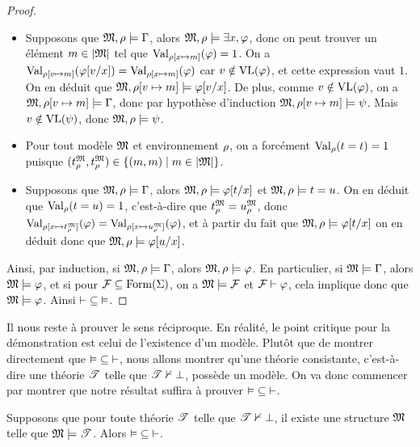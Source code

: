 \begin{proof}
\begin{itemize}
    alors $\satMI \varFF[t/x]$, mais comme on sait que
    $\ValE(\varFF[t/x])\leq\ValE(\exists x,\varFF)$, on en déduit que
    $\ValE(\exists x,\varFF) = 1$, donc $\satMI \exists x,\varFF$.
  \item[$\RexE$~:] Supposons que $\mathfrak{M},\rho\models\Gamma$,
    alors $\satMI \exists x,\varFF$, donc on peut trouver un élément
    $m\in\left\vert \mathfrak{M}\right\vert$ tel que $\operatorname{Val}_{\rho[x\mapsto m]}(\varphi) = 1$. On a
    $\operatorname{Val}_{\rho[v\mapsto m]}(\varphi[v/x]) = \operatorname{Val}_{\rho[x\mapsto m]}(\varphi)$ car
    $v \notin\operatorname{VL}(\varphi)$, et cette expression vaut $1$. On en déduit que
    $\mathfrak{M},\rho[v\mapsto m]\models \varphi[v/x]$. De plus, comme
    $v\notin\operatorname{VL}(\varphi)$, on a
    $\mathfrak{M},\rho[v\mapsto m]\models \Gamma$,
    donc par hypothèse d'induction $\mathfrak{M},\rho[v\mapsto m]\models \psi$.
    Mais $v\notin\operatorname{VL}(\psi)$, donc $\mathfrak{M},\rho\models \psi$.
  \item[$\ReqI$~:] Pour tout modèle $\mathfrak{M}$ et environnement $\rho$, on
    a forcément $\operatorname{Val}_{\rho}(t=t) = 1$ puisque
    $(t^{\mathfrak{M}}_{\rho},t^{\mathfrak{M}}_{\rho})\in\left\{ (m,m) \;\middle\vert\; m\in\left\vert \mathfrak{M}\right\vert \right\}$.
  \item[$\ReqE$~:] Supposons que $\mathfrak{M},\rho\models\Gamma$, alors
    $\satMI \varFF[t/x]$ et $\mathfrak{M},\rho\models t = u$. On en
    déduit que $\operatorname{Val}_{\rho}(t = u) = 1$, c'est-à-dire que $t^{\mathfrak{M}}_{\rho} = u^{\mathfrak{M}}_{\rho}$,
    donc
    $\operatorname{Val}_{\rho[x\mapsto t^{\mathfrak{M}}_{\rho}]}(\varphi)=
    \operatorname{Val}_{\rho[x\mapsto u^{\mathfrak{M}}_{\rho}]}(\varphi)$,
    et à partir du fait que $\satMI \varFF[t/x]$ on en déduit donc
    que $\mathfrak{M},\rho\models \varphi[u/x]$.
  \end{itemize}

  \noindent
  Ainsi, par induction, si $\mathfrak{M},\rho\models\Gamma$, alors
  $\mathfrak{M},\rho\models \varphi$. En particulier, si $\mathfrak{M}\models\Gamma$,
  alors $\mathfrak{M}\models\varphi$, et si pour
  $\mathcal F\subseteq \operatorname{Form}(\Sigma)$, on a
  $\mathfrak{M}\models \mathcal F$ et $\mathcal F\vdash \varphi$, cela implique donc que
  $\mathfrak{M}\models \varphi$. Ainsi $\mathord{\vdash}\subseteq\mathord{\vDash}$.
\end{proof}

Il nous reste à prouver le sens réciproque. En réalité, le point critique pour
la démonstration est celui de l'existence d'un modèle. Plutôt que de montrer
directement que $\mathord{\vDash}\subseteq\mathord{\vdash}$, nous allons montrer
qu'une théorie
consistante, c'est-à-dire une théorie $\mathscr T$ telle que
$\mathscr T\nvdash \bot$, possède un modèle. On va donc commencer par montrer
que notre résultat suffira à prouver $\mathord{\vDash}\subseteq\mathord{\vdash}$.

\begin{lemma}\label{lem.vDashvdashabs}
  Supposons que pour toute théorie $\mathscr T$ telle que
  $\mathscr T\nvdash\bot$, il existe une structure $\mathfrak{M}$ telle que
  $\mathfrak{M}\models \mathscr T$. Alors $\mathord{\vDash}\subseteq\mathord{\vdash}$.
\end{lemma}

